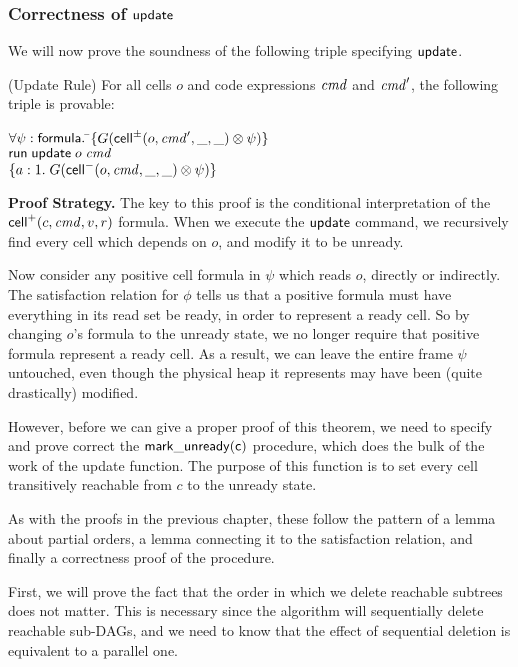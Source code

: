 \subsubsection{Correctness of $\mathsf{update}$}

We will now prove the soundness of the following triple specifying
$\mathsf{update}$.

\begin{prop}{(Update Rule)}
For all cells $o$ and code expressions $\mathit{cmd}$ and $\mathit{cmd}'$, the following
triple is provable: 

\begin{tabbing}
$\forall \psi:\mathsf{formula}.\; $\=$\{{G(\mathsf{cell}^{\pm}({o}, {\mathit{cmd}'}, {\_}, {\_}) \otimes \psi)}\}$ \\
                           \>$\mathsf{run}\;{\mathsf{update}\;o\;\mathit{cmd}}$ \\
                           \>$\{{a:1.\; G(\mathsf{cell}^{-}({o}, {\mathit{cmd}}, {\_}, {\_}) \otimes \psi)}\}$
\end{tabbing}
\end{prop}

\textbf{Proof Strategy.} The key to this proof is the conditional
interpretation of the $\mathsf{cell}^{+}({c}, {\mathit{cmd}}, {v}, {r})$ formula. When we execute
the $\mathsf{update}$ command, we recursively find every cell which
depends on $o$, and modify it to be unready.

Now consider any positive cell formula in $\psi$ which reads $o$,
directly or indirectly. The satisfaction relation for $\phi$ tells us
that a positive formula must have everything in its read set be ready,
in order to represent a ready cell. So by changing $o$'s formula to
the unready state, we no longer require that positive formula
represent a ready cell. As a result, we can leave the entire frame
$\psi$ untouched, even though the physical heap it represents may have
been (quite drastically) modified.

However, before we can give a proper proof of this theorem, we need to
specify and prove correct the $\mathsf{mark\_unready(c)}$ procedure,
which does the bulk of the work of the update function. The purpose of
this function is to set every cell transitively reachable from $c$ to
the unready state.

As with the proofs in the previous chapter, these follow the pattern 
of a lemma about partial orders, a lemma connecting it to the satisfaction
relation, and finally a correctness proof of the procedure. 

First, we will prove the fact that the order in which we delete
reachable subtrees does not matter. This is necessary since the 
algorithm will sequentially delete reachable sub-DAGs, and we
need to know that the effect of sequential deletion is equivalent
to a parallel one.  




